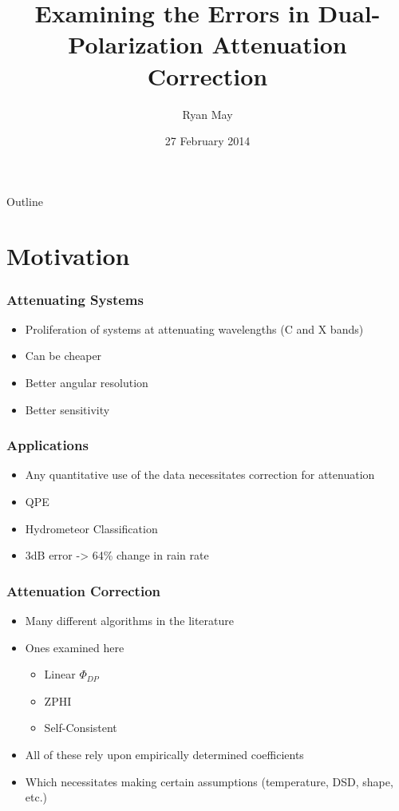 \documentclass[red]{beamer}
\title{Examining the Errors in Dual-Polarization Attenuation Correction}
\author{Ryan May}
\date{27 February 2014}
\begin{document}
\begin{frame}
	\titlepage
\end{frame}

\begin{frame}{Outline}
    \tableofcontents
\end{frame}

\section{Motivation}
\begin{frame}
	\frametitle{Attenuating Systems}
	\begin{itemize}
		\item Proliferation of systems at attenuating wavelengths (C and X bands)
		\item Can be cheaper
		\item Better angular resolution
		\item Better sensitivity
	\end{itemize}
\end{frame}

\begin{frame}
	\frametitle{Applications}
	\begin{itemize}
		\item Any quantitative use of the data necessitates correction for attenuation
		\item QPE
		\item Hydrometeor Classification
		\item 3dB error -> 64\% change in rain rate
	\end{itemize}
\end{frame}

\begin{frame}
	\frametitle{Attenuation Correction}
	\begin{itemize}
		\item Many different algorithms in the literature
		\item Ones examined here
		\begin{itemize}
			\item Linear $\Phi_{DP}$
			\item ZPHI
			\item Self-Consistent
		\end{itemize}
		\item All of these rely upon empirically determined coefficients
		\item Which necessitates making certain assumptions (temperature,
		DSD, shape, etc.)
	\end{itemize}
\end{frame}
\end{document}
